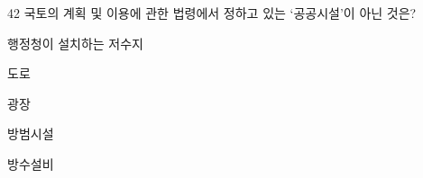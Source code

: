 \begin{question}{42}
국토의 계획 및 이용에 관한 법령에서 정하고 있는 ‘공공시설’이 아닌 것은?
\begin{choices}
  \item 행정청이 설치하는 저수지
  \item 도로
  \item 광장
  \item 방범시설
  \item 방수설비
\end{choices}
\end{question}
